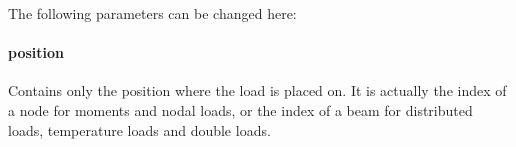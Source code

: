 \documentclass[a4paper,11pt]{report}
\begin{document}
\begin{minipage}[h]{0.5\textwidth-0.5cm}
\begin{figure}[H]
\label{pic:loadnmenu}
\end{figure}
\end{minipage}
\hfill
\begin{minipage}[h]{0.5\textwidth-0.5cm}

\end{minipage}



The following parameters can be changed here:

\paragraph{position} Contains only the position where the load is placed on. It is actually the index of a node for moments and nodal loads, or the index of a beam for distributed loads, temperature loads and double loads.
\end{document}
